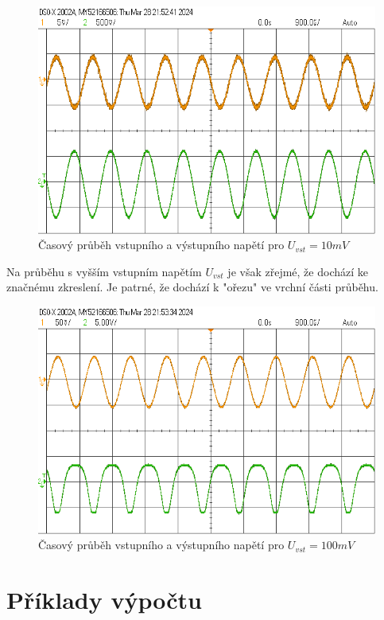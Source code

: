 \documentclass[a4paper, czech]{article}
\begin{document}
\begin{figure}[H]
    \centering
    \includegraphics{prubeh_10mVpp.png}
    \caption{Časový průběh vstupního a výstupního napětí pro $U_{vst} =  10 mV$}
\end{figure}

Na průběhu s vyšším vstupním napětím $U_{vst}$ je však zřejmé, že dochází ke značnému zkreslení. Je patrné, že dochází k "ořezu" ve vrchní části průběhu.

\begin{figure}[H]
    \centering
    \includegraphics{prubeh_100mVpp.png}
    \caption{Časový průběh vstupního a výstupního napětí pro $U_{vst} =  100 mV$}
\end{figure}

\section{Příklady výpočtu}
\end{document}
